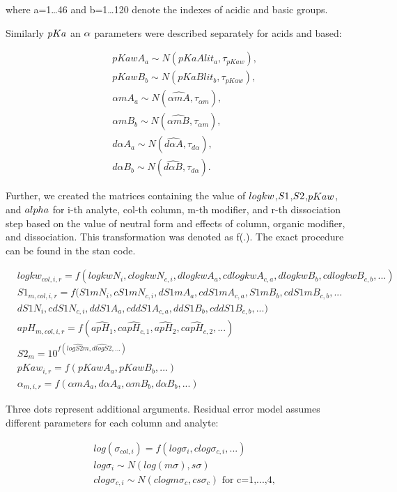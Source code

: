 \documentclass[
]{article}
\begin{document}
where a=1\ldots46 and b=1\ldots120 denote the indexes of acidic and
basic groups.

Similarly \(\small pKa\) an \(\small \alpha\) parameters were described
separately for acids and based:

\[
\begin{aligned}
& pKawA_{a} \sim N(pKaAlit_{a}, \tau_{pKaw}), \\
& pKawB_{b} \sim N(pKaBlit_{b}, \tau_{pKaw}), \\
& \alpha mA_{a} \sim N(\widehat{\alpha m A},\tau_{\alpha m}), \\
& \alpha mB_{b} \sim N(\widehat{\alpha m B},\tau_{\alpha m}), \\
& d\alpha A_{a} \sim N(\widehat{d\alpha A},\tau_{d\alpha}), \\
& d\alpha B_{b} \sim N(\widehat{d\alpha B},\tau_{d\alpha}).
\end{aligned}
\]

Further, we created the matrices containing the value of
\(\small logkw\),\(\small S1\),\(\small S2\),\(\small pKaw\), and
\(\small alpha\) for i-th analyte, col-th column, m-th modifier, and
r-th dissociation step based on the value of neutral form and effects of
column, organic modifier, and dissociation. This transformation was
denoted as f(.). The exact procedure can be found in the stan code.

\[
\begin{aligned}
& logkw_{col,i,r}= f(logkwN_i,clogkwN_{c,i},dlogkwA_{a},cdlogkwA_{c,a}, dlogkwB_{b}, cdlogkwB_{c,b},...) \\
& S1_{m,col,i,r}  = f(S1mN_i,cS1mN_{c,i}, dS1mA_a, cdS1mA_{c,a}, S1mB_b, cdS1mB_{c,b}, ...\\
& dS1N_i, cdS1N_{c,i}, ddS1A_a, cddS1A_{c,a}, ddS1B_b, cddS1B_{c,b},...) \\
& apH_{m,col,i,r} = f(\widehat{apH_1},\widehat{capH_{c,1}},\widehat{apH_2},\widehat{capH_{c,2}},...) \\
& S2_{m} = 10^{f(\widehat{logS2m},\widehat{dlogS2},...)} \\
& pKaw_{i,r} = f(pKawA_{a},pKawB_{b},...) \\
& \alpha_{m,i,r} = f(\alpha mA_{a}, d\alpha A_{a}, \alpha mB_{b}, d\alpha B_{b},...)
\end{aligned}
\]

Three dots represent additional arguments. Residual error model assumes
different parameters for each column and analyte:

\[
\begin{aligned}
& log(\sigma_{col,i}) = f(log\sigma_i, clog\sigma_{c,i},...) \\
& log\sigma_i  \sim N(log(m\sigma),s\sigma) \\
& clog\sigma_{c,i} \sim N(clogm\sigma_c,cs\sigma_c) \text{ for c=1,...,4},
\end{aligned}
\]
\end{document}
